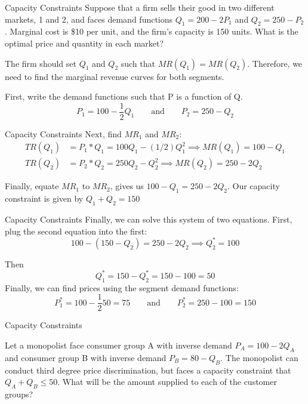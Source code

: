 \documentclass{beamer}
\begin{document}
\begin{frame}{Capacity Constraints}
  Suppose that a firm sells their good in two different markets, 1 and 2, and faces demand functions $Q_1 = 200 - 2P_1$ and $Q_2 = 250 - P_2$. Marginal cost is \$10 per unit, and the firm's capacity is 150 units. What is the optimal price and quantity in each market?

  \bigskip
  The firm should set $Q_1$ and $Q_2$ such that $MR(Q_1) = MR(Q_2)$. Therefore, we need to find the marginal revenue curves for both segments.

  \bigskip
  First, write the demand functions such that P is a function of Q.
  $$
    P_1=100-\frac{1}{2}Q_1 \qquad \text{and} \qquad P_2=250 - Q_2
  $$
\end{frame}

\begin{frame}{Capacity Constraints}
  Next, find $MR_1$ and $MR_2$:
  \begin{align*}
    TR(Q_1) &= P_1*Q_1 = 100Q_1 - (1/2)Q_1^2 \implies MR(Q_1) = 100 - Q_1 \\
    TR(Q_2) &= P_2*Q_2 = 250Q_2 - Q_2^2 \implies MR(Q_2) = 250 - 2Q_2
  \end{align*}
  
  \bigskip
  Finally, equate $MR_1$ to $MR_2$, gives us $100 - Q_1 = 250 - 2Q_2$. Our capacity constraint is given by $Q_1 + Q_2 = 150$
\end{frame}

\begin{frame}{Capacity Constraints}
  Finally, we can solve this system of two equations. First, plug the second equation into the first:
  $$
    100 - (150 - Q_2) = 250 - 2Q_2 \implies Q_2^* = 100
  $$

  Then
  $$
    Q_1^* = 150 - Q_2^* = 150-100 = 50
  $$
  Finally, we can find prices using the segment demand functions:
  $$
    P_1^* = 100 - \frac{1}{2} 50 = 75 \qquad \text{and} \qquad P_2^* = 250 - 100 = 150
  $$
\end{frame}

\begin{frame}{Capacity Constraints}


  Let a monopolist face consumer group A with inverse demand $P_A = 100 - 2Q_A$ and consumer group B with inverse demand $P_B = 80 - Q_B$.  The monopolist can conduct third degree price discrimination, but faces a capacity constraint that $Q_A + Q_B \leq 50$. What will be the amount supplied to each of the customer groups?
\end{frame}
\end{document}
